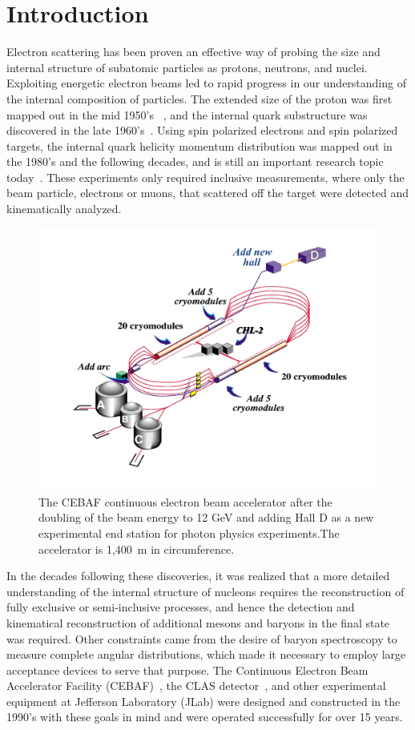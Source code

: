 \documentclass[final,3p,times,twocolumn,authoryear]{elsarticle}
\begin{document}
\linenumbers
\section{Introduction}

Electron scattering has been proven an effective way of probing the size and internal structure of subatomic particles as protons, neutrons, and nuclei. Exploiting energetic electron beams led to rapid progress in our understanding of the internal composition of particles. The extended size of the proton was first mapped out in the mid 1950's~\cite{Mcallister:1956ng} , and the internal quark substructure was discovered in the late 1960's~\cite{Breidenbach:1969kd}. Using spin polarized electrons and spin polarized targets, the internal quark helicity momentum distribution was mapped out in the 1980's and the following decades, and is still an important research topic today~\cite{Kuhn:2008sy}. These experiments only required inclusive measurements, where only the beam particle, electrons or muons, that scattered off the target were detected and kinematically analyzed.  
\begin{figure}[ht]
\centerline{\includegraphics[width=1.8\columnwidth]{cebaf.pdf}}
\caption{The CEBAF continuous electron beam accelerator after the doubling of the beam energy to 12 GeV and 
adding Hall D as a new experimental end station for photon physics experiments.The accelerator is 1,400~m in circumference. }
\label{cebaf12}
\end{figure} 
In the decades following these discoveries, it was realized that a more detailed understanding of the internal structure of nucleons requires  the 
reconstruction of fully exclusive or semi-inclusive processes, and hence the detection and kinematical reconstruction of additional mesons and baryons in the final state was required.  Other constraints came from the desire of baryon spectroscopy to 
measure complete angular distributions, which made it necessary to employ large acceptance devices to serve that purpose. 
The Continuous Electron Beam Accelerator Facility (CEBAF)~\cite{Leemann:2001dg}, the CLAS detector~\cite{Mecking:2003zu}, and other experimental equipment at Jefferson Laboratory (JLab) were designed and constructed in the 1990's with these
goals in mind and were operated successfully for over 15 years. 
 
\end{document}
